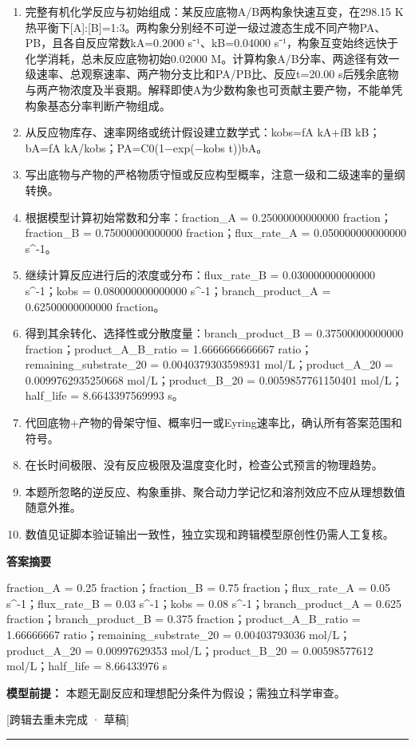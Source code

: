 \documentclass[UTF8,11pt,a4paper]{ctexart}
\begin{document}
\begin{enumerate}
\item 完整有机化学反应与初始组成：某反应底物A/B两构象快速互变，在298.15 K热平衡下[A]:[B]=1:3。两构象分别经不可逆一级过渡态生成不同产物PA、PB，且各自反应常数kA=0.2000 s⁻¹、kB=0.04000 s⁻¹，构象互变始终远快于化学消耗，总未反应底物初始0.02000 M。计算构象A/B分率、两途径有效一级速率、总观察速率、两产物分支比和PA/PB比、反应t=20.00 s后残余底物与两产物浓度及半衰期。解释即使A为少数构象也可贡献主要产物，不能单凭构象基态分率判断产物组成。
\item 从反应物库存、速率网络或统计假设建立数学式：kobs=fA kA+fB kB；bA=fA kA/kobs；PA=C0(1−exp(−kobs t))bA。
\item 写出底物与产物的严格物质守恒或反应构型概率，注意一级和二级速率的量纲转换。
\item 根据模型计算初始常数和分率：fraction\_A = 0.25000000000000 fraction；fraction\_B = 0.75000000000000 fraction；flux\_rate\_A = 0.050000000000000 s\textasciicircum{}-1。
\item 继续计算反应进行后的浓度或分布：flux\_rate\_B = 0.030000000000000 s\textasciicircum{}-1；kobs = 0.080000000000000 s\textasciicircum{}-1；branch\_product\_A = 0.62500000000000 fraction。
\item 得到其余转化、选择性或分散度量：branch\_product\_B = 0.37500000000000 fraction；product\_A\_B\_ratio = 1.6666666666667 ratio；remaining\_substrate\_20 = 0.0040379303598931 mol/L；product\_A\_20 = 0.0099762935250668 mol/L；product\_B\_20 = 0.0059857761150401 mol/L；half\_life = 8.6643397569993 s。
\item 代回底物+产物的骨架守恒、概率归一或Eyring速率比，确认所有答案范围和符号。
\item 在长时间极限、没有反应极限及温度变化时，检查公式预言的物理趋势。
\item 本题所忽略的逆反应、构象重排、聚合动力学记忆和溶剂效应不应从理想数值随意外推。
\item 数值见证脚本验证输出一致性，独立实现和跨辑模型原创性仍需人工复核。
\end{enumerate}
\noindent\textbf{答案摘要}\par
fraction\_A = 0.25 fraction；fraction\_B = 0.75 fraction；flux\_rate\_A = 0.05 s\textasciicircum{}-1；flux\_rate\_B = 0.03 s\textasciicircum{}-1；kobs = 0.08 s\textasciicircum{}-1；branch\_product\_A = 0.625 fraction；branch\_product\_B = 0.375 fraction；product\_A\_B\_ratio = 1.66666667 ratio；remaining\_substrate\_20 = 0.00403793036 mol/L；product\_A\_20 = 0.00997629353 mol/L；product\_B\_20 = 0.00598577612 mol/L；half\_life = 8.66433976 s\par
\noindent\textbf{模型前提：}
本题无副反应和理想配分条件为假设；需独立科学审查。\par
\noindent\textcolor{red!65!black}{[跨辑去重未完成 · 草稿]} \par
\medskip\hrule\medskip
{}
\end{document}
